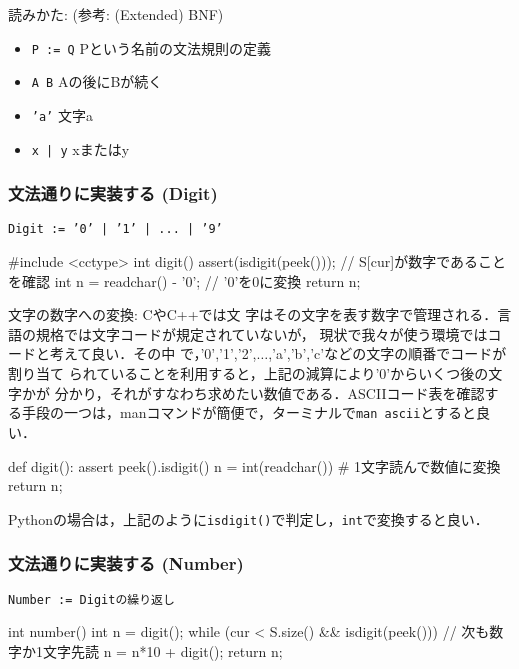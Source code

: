 読みかた: (参考: (Extended) BNF)
\begin{itemize}
\setlength{\itemsep}{0pt}
\item \texttt{P := Q} \dingright Pという名前の文法規則の定義
\item \texttt{A B} \dingright Aの後にBが続く
\item \texttt{'a'} \dingright 文字a
\item \texttt{x | y} \dingright xまたはy
\end{itemize}


\subsubsection{文法通りに実装する (Digit)}
\texttt{\textcolor{ired}{Digit := '0' | '1' | ... | '9'}}

\begin{cbox}[emph={digit,peek,readchar}]
#include <cctype>
int digit() {
  assert(isdigit(peek()));  // S[cur]が数字であることを確認
  int n = readchar() - '0'; // '0'を0に変換
  return n;
}
\end{cbox}
文字の数字への変換: CやC++では文
字はその文字を表す数字で管理される．言語の規格では文字コードが規定されていないが，
現状で我々が使う環境ではコードと考えて良い．その中
で，'0','1','2',$\ldots$,'a','b','c'などの文字の順番でコードが割り当て
られていることを利用すると，上記の減算により'0'からいくつ後の文字かが
分かり，それがすなわち求めたい数値である．ASCIIコード表を確認する手段の一つは，manコマンドが簡便で，ターミナルで\texttt{man ascii}とすると良い．

\begin{pybox}
def digit():
  assert peek().isdigit()
  n = int(readchar()) # 1文字読んで数値に変換
  return n;
\end{pybox}

Pythonの場合は，上記のように\texttt{isdigit()}で判定し，\texttt{int}で変換すると良い．

\subsubsection{文法通りに実装する (Number)}
\texttt{\textcolor{ired}{Number := Digitの繰り返し}}

\begin{cbox}[emph={number},emph={[2]digit}]
int number() {
  int n = digit();
  while (cur < S.size() && isdigit(peek())) // 次も数字か1文字先読
    n = n*10 + digit(); 
  return n;
}
\end{cbox}

